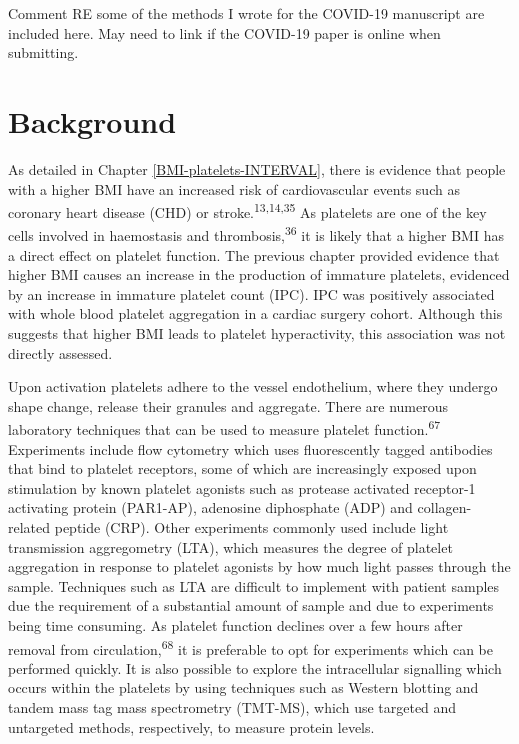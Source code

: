 \documentclass[11pt,twoside]{bristolthesis}
\begin{document}
Comment RE some of the methods I wrote for the COVID-19 manuscript are included here. May need to link if the COVID-19 paper is online when submitting.

\hypertarget{background-2}{%
\section{Background}\label{background-2}}

As detailed in Chapter \ref{BMI-platelets-INTERVAL}, there is evidence that people with a higher BMI have an increased risk of cardiovascular events such as coronary heart disease (CHD) or stroke.\textsuperscript{13,14,35} As platelets are one of the key cells involved in haemostasis and thrombosis,\textsuperscript{36} it is likely that a higher BMI has a direct effect on platelet function. The previous chapter provided evidence that higher BMI causes an increase in the production of immature platelets, evidenced by an increase in immature platelet count (IPC). IPC was positively associated with whole blood platelet aggregation in a cardiac surgery cohort. Although this suggests that higher BMI leads to platelet hyperactivity, this association was not directly assessed.

Upon activation platelets adhere to the vessel endothelium, where they undergo shape change, release their granules and aggregate. There are numerous laboratory techniques that can be used to measure platelet function.\textsuperscript{67} Experiments include flow cytometry which uses fluorescently tagged antibodies that bind to platelet receptors, some of which are increasingly exposed upon stimulation by known platelet agonists such as protease activated receptor-1 activating protein (PAR1-AP), adenosine diphosphate (ADP) and collagen-related peptide (CRP). Other experiments commonly used include light transmission aggregometry (LTA), which measures the degree of platelet aggregation in response to platelet agonists by how much light passes through the sample. Techniques such as LTA are difficult to implement with patient samples due the requirement of a substantial amount of sample and due to experiments being time consuming. As platelet function declines over a few hours after removal from circulation,\textsuperscript{68} it is preferable to opt for experiments which can be performed quickly. It is also possible to explore the intracellular signalling which occurs within the platelets by using techniques such as Western blotting and tandem mass tag mass spectrometry (TMT-MS), which use targeted and untargeted methods, respectively, to measure protein levels.
\end{document}
